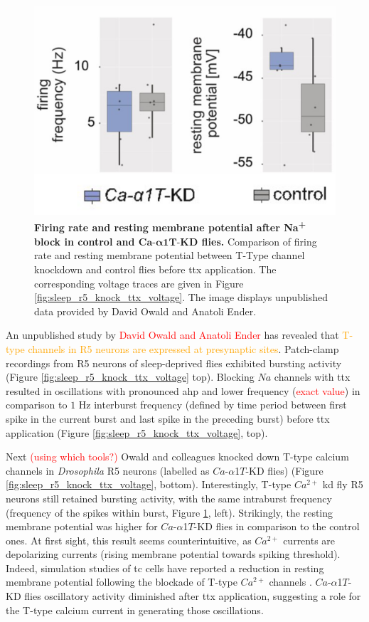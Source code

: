 \documentclass[../main.tex]{subfiles}
\begin{document}
\begin{figure}[!t]
    \centering
    \includegraphics[width=0.5\linewidth]{../img/sleep_and_r5_network/CaaT_knock_and_ttx/frequencies_whole.png}
    \caption[Firing rate and resting membrane potential after $Na$\textsuperscript{+} block in control and $Ca\text{-}\alpha1T\text{-KD}$ flies]{
        \textbf{Firing rate and resting membrane potential after Na\textsuperscript{+} block in control and $\bm{Ca\text{-}\alpha1T\text{-KD}}$ flies.}
        Comparison of firing rate and resting membrane potential between T-Type channel knockdown and control flies before \gls{ttx} application. The corresponding voltage traces are given in Figure \ref{fig:sleep_r5_knock_ttx_voltage}.
        The image displays unpublished data provided by David Owald and Anatoli Ender.
    }
    \label{fig:sleep_r5_knock_ttx_frequencies}
\end{figure}

An unpublished study by \textcolor{red}{David Owald and Anatoli Ender} has revealed that \textcolor{orange}{T-type channels in R5 neurons are expressed at presynaptic sites}.
Patch-clamp recordings from R5 neurons of sleep-deprived flies exhibited bursting activity (Figure \ref{fig:sleep_r5_knock_ttx_voltage} top). Blocking $Na$ channels with \gls{ttx} resulted in oscillations with pronounced \gls{ahp} and lower frequency (\textcolor{red}{exact value}) in comparison to $1$ Hz interburst frequency (defined by time period between first spike in the current burst and last spike in the preceding burst) before \gls{ttx} application (Figure \ref{fig:sleep_r5_knock_ttx_voltage}, top).

Next \textcolor{red}{(using which tools?)} Owald and colleagues knocked down T-type calcium channels in \textit{Drosophila} R5 neurons (labelled as $Ca$-$\alpha$1$T$-KD flies) (Figure \ref{fig:sleep_r5_knock_ttx_voltage}, bottom). Interestingly, T-type $Ca^{2+}$ \gls{kd} fly R5 neurons still retained bursting activity, with the same intraburst frequency (frequency of the spikes within burst, Figure \ref{fig:sleep_r5_knock_ttx_frequencies}, left). Strikingly, the resting membrane potential was higher for $Ca$-$\alpha$1$T$-KD flies in comparison to the control ones. At first sight, this result seems counterintuitive, as $Ca^{2+}$ currents are depolarizing currents (rising membrane potential towards spiking threshold). Indeed, simulation studies of \gls{tc} cells have reported a reduction in resting membrane potential following the blockade of T-type $Ca^{2+}$ channels \cite{amarilloInterplaySevenSubthreshold2014}.
$Ca$-$\alpha$1$T$-KD flies oscillatory activity diminished after \gls{ttx} application, suggesting a role for the T-type calcium current in generating those oscillations.
\end{document}
